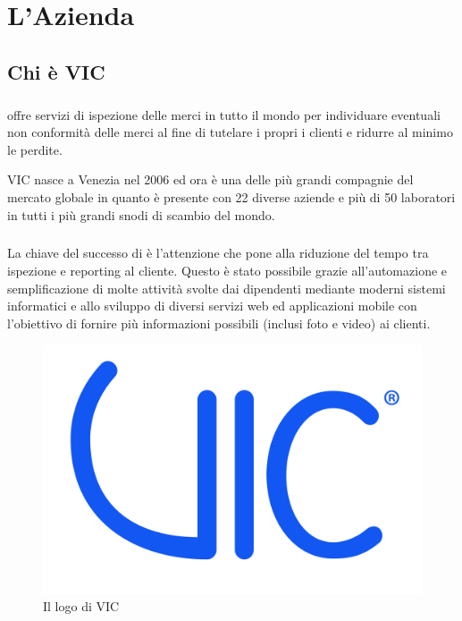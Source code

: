 
\chapter{L'Azienda}
\label{cap:azienda}



\section{Chi è VIC} %
	\paragraph{} 
	\vic{}\cite{site:vic} offre servizi di ispezione delle merci in tutto il mondo per individuare eventuali non conformità delle merci al fine di tutelare i propri i clienti e ridurre al minimo le perdite.
	
	VIC nasce a Venezia nel 2006 ed ora è una delle più grandi compagnie del mercato globale in quanto 
	è presente con 22 diverse aziende e più di 50 laboratori in tutti i più grandi snodi di scambio del mondo.
	
	\paragraph{} La chiave del successo di \vic{} è l'attenzione che pone alla riduzione del tempo tra ispezione e reporting al cliente. 
	Questo è stato possibile grazie all'automazione e semplificazione di molte attività svolte dai dipendenti mediante moderni sistemi
	informatici e allo sviluppo di diversi servizi web ed applicazioni mobile con l’obiettivo di fornire più informazioni possibili (inclusi foto e video) ai clienti.
	
	
	\begin{figure}[ht]
		\centering
		\includegraphics[width=0.5\linewidth]{immagini/logo-vic}
		\caption{Il logo di VIC}
		\label{fig:logo-vic}
	\end{figure}
	 

